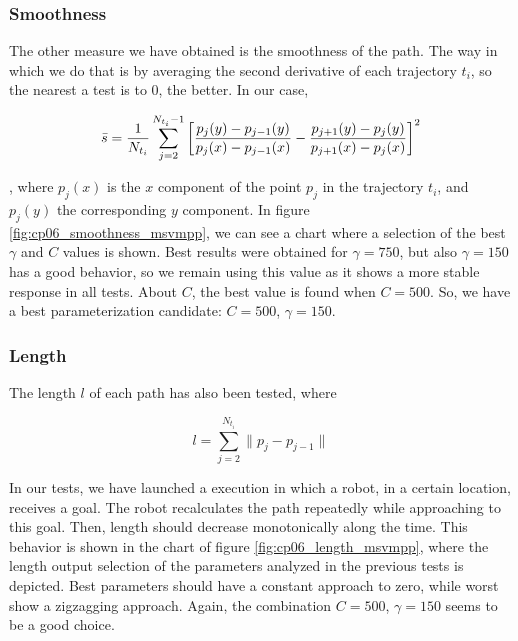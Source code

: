 \subsubsection{Smoothness}\label{ch:chapter06_02_01_02}

The other measure we have obtained is the smoothness of the path. The way in which we do that is by averaging the second derivative of each trajectory $t_i$, so the nearest a test is to $0$, the better. In our case,

\begin{equation}\label{eq:cp06_avg_smooth}
  \bar{s} = {1 \over N_{t_i}} \sum_{j=2}^{N_{t_i} - 1} \left[ {{p_j(y) - p_{j-1}(y)} \over {p_j(x) - p_{j-1}(x)}} - {{p_{j + 1}(y) - p_j(y)} \over {p_{j + 1}(x) - p_j(x)}} \right]^2
\end{equation}

, where $p_j(x)$ is the $x$ component of the point $p_j$ in the trajectory $t_i$, and $p_j(y)$ the corresponding $y$ component. In figure \ref{fig:cp06_smoothness_msvmpp}, we can see a chart where a selection of the best $\gamma$ and $C$ values is shown. Best results were obtained for $\gamma=750$, but also $\gamma=150$ has a good behavior, so we remain using this value as it shows a more stable response in all tests. About $C$, the best value is found when $C=500$. So, we have a best parameterization candidate: $C=500$, $\gamma=150$.

\subsubsection{Length}\label{ch:chapter06_02_01_03}

The length $l$ of each path has also been tested, where

\begin{equation}\label{eq:cp06_length}
  l = \sum_{j=2}^{N_{t_i}} \| p_j - p_{j - 1}\|
\end{equation}

In our tests, we have launched a execution in which a robot, in a certain location, receives a goal. The robot recalculates the path repeatedly while approaching to this goal. Then, length should decrease monotonically along the time. This behavior is shown in the chart of figure \ref{fig:cp06_length_msvmpp}, where the length output selection of the parameters analyzed in the previous tests is depicted. Best parameters should have a constant approach to zero, while worst show a zigzagging approach. Again, the combination $C=500$, $\gamma=150$ seems to be a good choice.

